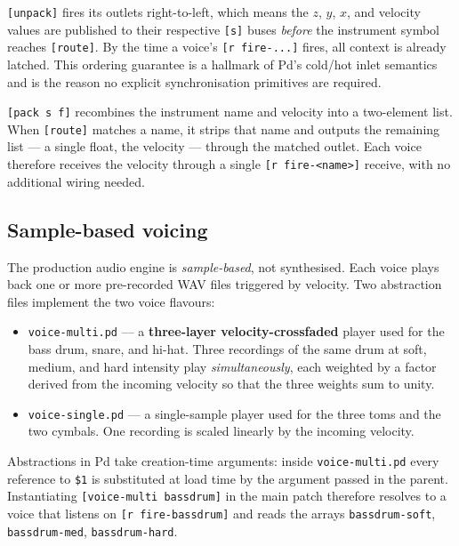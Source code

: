 \documentclass[11pt,a4paper]{article}
\begin{document}
\texttt{[unpack]} fires its outlets right-to-left, which means the
$z$, $y$, $x$, and velocity values are published to their respective
\texttt{[s]} buses \emph{before} the instrument symbol reaches
\texttt{[route]}. By the time a voice's \texttt{[r fire-...]} fires,
all context is already latched. This ordering guarantee is a hallmark
of Pd's cold/hot inlet semantics and is the reason no explicit
synchronisation primitives are required.

\texttt{[pack s f]} recombines the instrument name and velocity into
a two-element list. When \texttt{[route]} matches a name, it strips
that name and outputs the remaining list --- a single float, the
velocity --- through the matched outlet. Each voice therefore
receives the velocity through a single \texttt{[r fire-<name>]}
receive, with no additional wiring needed.

\subsection{Sample-based voicing}

The production audio engine is \emph{sample-based}, not synthesised.
Each voice plays back one or more pre-recorded WAV files triggered by
velocity. Two abstraction files implement the two voice flavours:

\begin{itemize}[leftmargin=2em]
    \item \texttt{voice-multi.pd} --- a \textbf{three-layer
          velocity-crossfaded} player used for the bass drum, snare,
          and hi-hat. Three recordings of the same drum at soft,
          medium, and hard intensity play \emph{simultaneously}, each
          weighted by a factor derived from the incoming velocity so
          that the three weights sum to unity.
    \item \texttt{voice-single.pd} --- a single-sample player used
          for the three toms and the two cymbals. One recording is
          scaled linearly by the incoming velocity.
\end{itemize}

Abstractions in Pd take creation-time arguments: inside
\texttt{voice-multi.pd} every reference to \texttt{\$1} is substituted
at load time by the argument passed in the parent. Instantiating
\texttt{[voice-multi bassdrum]} in the main patch therefore resolves
to a voice that listens on \texttt{[r fire-bassdrum]} and reads the
arrays \texttt{bassdrum-soft}, \texttt{bassdrum-med},
\texttt{bassdrum-hard}.
\end{document}
